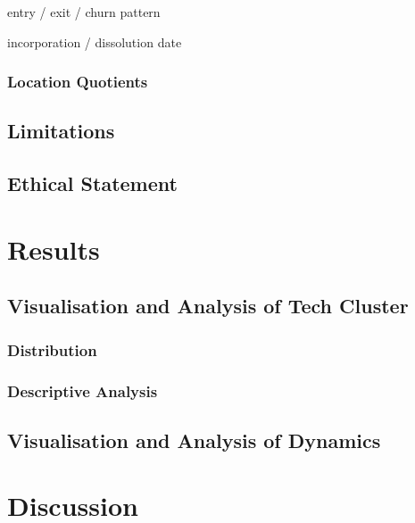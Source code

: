 \documentclass[
  12pt,
  oneside]{book}
\begin{document}
entry / exit / churn pattern

incorporation / dissolution date

\hypertarget{location-quotients}{%
\subsection{Location Quotients}\label{location-quotients}}

\hypertarget{limitations}{%
\section{Limitations}\label{limitations}}

\hypertarget{ethical-statement}{%
\section{Ethical Statement}\label{ethical-statement}}

\hypertarget{results}{%
\chapter{Results}\label{results}}

\hypertarget{visualisation-and-analysis-of-tech-cluster}{%
\section{Visualisation and Analysis of Tech Cluster}\label{visualisation-and-analysis-of-tech-cluster}}

\hypertarget{distribution}{%
\subsection{Distribution}\label{distribution}}

\hypertarget{descriptive-analysis}{%
\subsection{Descriptive Analysis}\label{descriptive-analysis}}

\hypertarget{visualisation-and-analysis-of-dynamics}{%
\section{Visualisation and Analysis of Dynamics}\label{visualisation-and-analysis-of-dynamics}}

\hypertarget{discussion}{%
\chapter{Discussion}\label{discussion}}
\end{document}
